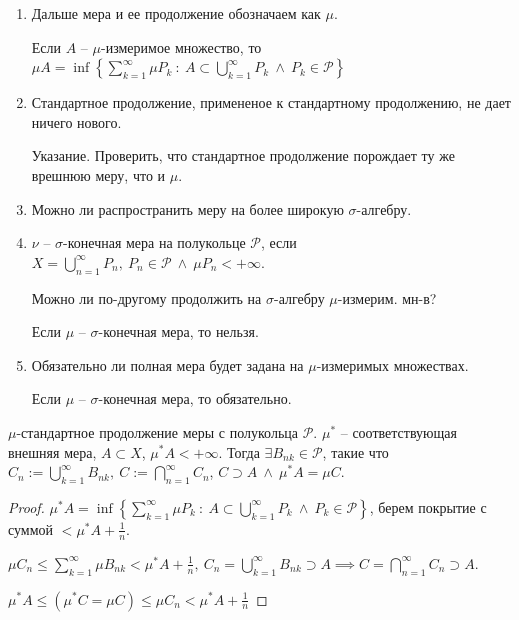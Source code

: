 \begin{remark}
    \begin{enumerate}
        \item {
            Дальше мера и ее продолжение обозначаем как $\mu$.

            Если $A$ -- $\mu$-измеримое множество, то $\mu A = \inf \left\{ \sum_{k=1}^{\infty} \mu P_k \ : \ A \subset \bigcup_{k=1}^{\infty} P_k \ \land \ P_k \in \mathcal{P} \right\}$
        }
        \item {
            Стандартное продолжение, примененое к стандартному продолжению, не дает ничего нового.

            \begin{exerc}
                Указание. Проверить, что стандартное продолжение порождает ту же врешнюю меру, что и $\mu$.
            \end{exerc}
        }
        \item {
            Можно ли распространить меру на более широкую $\sigma$-алгебру.
        }
        \item {
            \begin{definition}
                $\nu$ -- $\sigma$-конечная мера на полукольце $\mathcal{P}$, если $X = \bigcup_{n=1}^{\infty}P_n, \ P_n \in \mathcal{P} \ \land \ \mu P_n < +\infty$.
            \end{definition}
            
            Можно ли по-другому продолжить на $\sigma$-алгебру $\mu$-измерим. мн-в?

            Если $\mu$ -- $\sigma$-конечная мера, то нельзя.
        }
        \item {
            Обязательно ли полная мера будет задана на $\mu$-измеримых множествах.

            Если $\mu$ -- $\sigma$-конечная мера, то обязательно.
        }
    \end{enumerate}
\end{remark}


\begin{theorem}
    $\mu$-стандартное продолжение меры с полукольца $\mathcal{P}$. $\mu^*$ -- соответствующая внешняя мера, $A \subset X$, $\mu^* A < + \infty$. Тогда $\exists B_{nk} \in \mathcal{P}$, такие что $C_{n} := \bigcup_{k=1}^{\infty} B_{nk}, \ C := \bigcap_{n=1}^{\infty} C_n$, $C \supset A \ \land \ \mu^* A = \mu C$.
\end{theorem}
\begin{proof}
    $\mu^* A = \inf \left\{ \sum_{k=1}^{\infty} \mu P_k \ : \ A \subset \bigcup_{k=1}^{\infty} P_k \ \land \ P_k \in \mathcal{P} \right\}$, берем покрытие с суммой $< \mu^* A + \frac{1}{n}$.

    $\mu C_n \leq \sum_{k=1}^{\infty} \mu B_{nk} < \mu^* A + \frac{1}{n}, \ C_n = \bigcup_{k=1}^{\infty} B_{nk} \supset A \implies C = \bigcap_{n=1}^{\infty} C_n \supset A$.

    $\mu^*A \leq (\mu^* C = \mu C) \leq \mu C_n < \mu^* A + \frac{1}{n}$
\end{proof}

